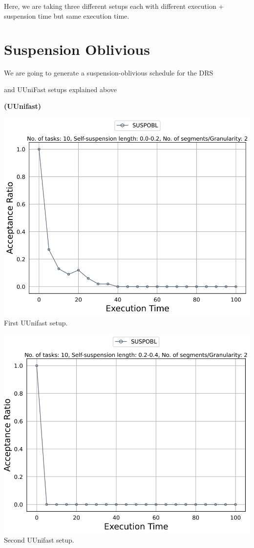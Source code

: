 \documentclass[]{article}
\begin{document}
{\raggedleft
Here, we are taking three different setups each with different execution + suspension time but same execution time.
}
	\clearpage

\section{Suspension Oblivious}

{
\raggedleft We are going to generate a suspension-oblivious schedule for the DRS
}

{
\raggedleft and UUniFast setups explained above
}

	
	\begin{minipage}[t]{0.48\linewidth}
		\centering
		\textbf{(UUnifast)}
		\vspace{0.3cm}
		
		\includegraphics[width=\linewidth]{Capture.png}
		First UUnifast setup.

  
		\vspace{0.3cm}
		
		\includegraphics[width=\linewidth]{Capture2_uunifast.png}
		Second UUnifast setup.
		\vspace{0.3cm}
		

\end{minipage}
\end{document}
